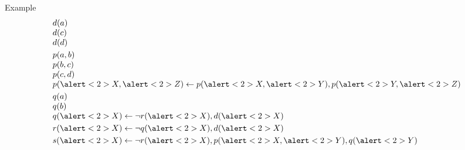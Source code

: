 \begin{frame}[c]{Example}
  \[
    \begin{array}{l}
      d(a) \\
      d(c) \\
      d(d) \\[3pt]
      p(a,b) \\
      p(b,c) \\
      p(c,d) \\
      p(\alert<2>{X},\alert<2>{Z}) \leftarrow p(\alert<2>{X},\alert<2>{Y}), p(\alert<2>{Y},\alert<2>{Z}) \\[3pt]
      q(a) \\
      q(b) \\
      q(\alert<2>{X}) \leftarrow \neg r(\alert<2>{X}), d(\alert<2>{X}) \\[3pt]
      r(\alert<2>{X}) \leftarrow \neg q(\alert<2>{X}), d(\alert<2>{X}) \\[3pt]
      s(\alert<2>{X}) \leftarrow \neg r(\alert<2>{X}), p(\alert<2>{X},\alert<2>{Y}), q(\alert<2>{Y})
    \end{array}
  \]
  \bigskip
\end{frame}
%
